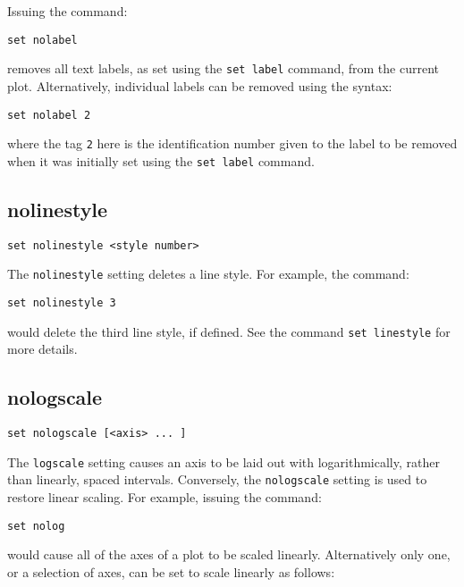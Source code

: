 Issuing the command:

\begin{verbatim}
set nolabel
\end{verbatim}

\noindent removes all text labels, as set using the {\tt set label} command,
from the current plot. Alternatively, individual labels can be removed using
the syntax:

\begin{verbatim}
set nolabel 2
\end{verbatim}

\noindent where the tag {\tt 2} here is the identification number given to
the label to be removed when it was initially set using the {\tt set label}
command.

\subsection{nolinestyle}

\begin{verbatim}
set nolinestyle <style number>
\end{verbatim}

The {\tt nolinestyle} setting deletes a line style. For example, the command:

\begin{verbatim}
set nolinestyle 3
\end{verbatim}

\noindent would delete the third line style, if defined. See the command {\tt set
linestyle} for more details.


\subsection{nologscale}

\begin{verbatim}
set nologscale [<axis> ... ]
\end{verbatim}

The {\tt logscale} setting causes an axis to be laid out with logarithmically,
rather than linearly, spaced intervals. Conversely, the {\tt nologscale} setting
is used to restore linear scaling. For example, issuing the command:

\begin{verbatim}
set nolog 
\end{verbatim}

\noindent would cause all of the axes of a plot to be scaled linearly. Alternatively only one,
or a selection of axes, can be set to scale linearly as follows:

